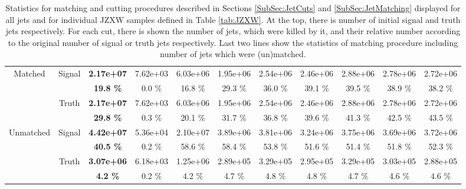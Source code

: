 \begin{appendices}
\begin{landscape}
\begin{table}
\begin{tabular}{|c|c|>{\bfseries}c|c|c|c|c|c|c|c|c|}
    \hline                                                                                      
    \hline                                                                                      
    \multirow{4}{*}{Matched}        & \multirow{2}{*}{Signal}   & 2.17e+07 & 7.62e+03 & 6.03e+06 & 1.95e+06 & 2.54e+06 & 2.46e+06 & 2.88e+06 & 2.78e+06 & 2.72e+06 \\
                                    &                           & 19.8 \%  & 0.0 \%   & 16.8 \%  & 29.3 \%  & 36.0 \%  & 39.1 \%  & 39.5 \%  & 38.9 \%  & 38.2 \%  \\
    \cline{2-11}                                                                                    
                                    & \multirow{2}{*}{Truth}    & 2.17e+07 & 7.62e+03 & 6.03e+06 & 1.95e+06 & 2.54e+06 & 2.46e+06 & 2.88e+06 & 2.78e+06 & 2.72e+06 \\
                                    &                           & 29.8 \%  & 0.3 \%   & 20.1 \%  & 31.7 \%  & 36.8 \%  & 39.6 \%  & 41.3 \%  & 42.5 \%  & 43.5 \%  \\
    \hline                                                                                      
    \hline                                                                                      
    \multirow{4}{*}{Unmatched}      & \multirow{2}{*}{Signal}   & 4.42e+07 & 5.36e+04 & 2.10e+07 & 3.89e+06 & 3.81e+06 & 3.24e+06 & 3.75e+06 & 3.69e+06 & 3.72e+06 \\
                                    &                           & 40.5 \%  & 0.2 \%   & 58.6 \%  & 58.4 \%  & 53.8 \%  & 51.6 \%  & 51.4 \%  & 51.8 \%  & 52.3 \%  \\
    \cline{2-11}                                                                                    
                                    & \multirow{2}{*}{Truth}    & 3.07e+06 & 6.18e+03 & 1.25e+06 & 2.89e+05 & 3.29e+05 & 2.95e+05 & 3.29e+05 & 3.03e+05 & 2.88e+05 \\
                                    &                           & 4.2 \%   & 0.2 \%   & 4.2 \%   & 4.7 \%   & 4.8 \%   & 4.8 \%   & 4.7 \%   & 4.6 \%   & 4.6 \%   \\
    \hline
  \end{tabular}
  \caption{Statistics for matching and cutting procedures described in Sections
    \ref{SubSec:JetCuts} and \ref{SubSec:JetMatching} displayed for all jets and for
    individual JZXW samples defined in Table \ref{tab:JZXW}. At the top, there is
    number of initial signal and truth jets respectively. For each cut, there is
    shown the number of jets, which were killed by it, and their relative number
    according to the original number of signal or truth jets respectively.
    Last two lines show the statistics of matching procedure including number of
    jets which were (un)matched.}
  \label{tab:CutAndMatchingEfficiency}
\end{table} 
\end{landscape}


\end{appendices}
